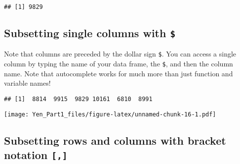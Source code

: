 \documentclass[
]{article}
\newenvironment{Shaded}{\begin{snugshade}}{\end{snugshade}}
\newcommand{\CommentTok}[1]{\textcolor[rgb]{0.56,0.35,0.01}{\textit{#1}}}
\newcommand{\DecValTok}[1]{\textcolor[rgb]{0.00,0.00,0.81}{#1}}
\newcommand{\FunctionTok}[1]{\textcolor[rgb]{0.00,0.00,0.00}{#1}}
\newcommand{\NormalTok}[1]{#1}
\newcommand{\SpecialCharTok}[1]{\textcolor[rgb]{0.00,0.00,0.00}{#1}}
\begin{document}
\begin{Shaded}
\end{Shaded}

\begin{verbatim}
## [1] 9829
\end{verbatim}

\hypertarget{subsetting-single-columns-with}{%
\subsection{\texorpdfstring{Subsetting single columns with
\texttt{\$}}{Subsetting single columns with \$}}\label{subsetting-single-columns-with}}

Note that columns are preceded by the dollar sign \texttt{\$}. You can
access a single column by typing the name of your data frame, the
\texttt{\$}, and then the column name. Note that autocomplete works for
much more than just function and variable names!

\begin{Shaded}
\end{Shaded}

\begin{verbatim}
## [1]  8814  9915  9829 10161  6810  8991
\end{verbatim}

\begin{Shaded}
\end{Shaded}

\texttt{[image: Yen\_Part1\_files/figure-latex/unnamed-chunk-16-1.pdf]}

\hypertarget{subsetting-rows-and-columns-with-bracket-notation}{%
\subsection{\texorpdfstring{Subsetting rows and columns with bracket
notation
\texttt{{[},{]}}}{Subsetting rows and columns with bracket notation {[},{]}}}\label{subsetting-rows-and-columns-with-bracket-notation}}
\end{document}
